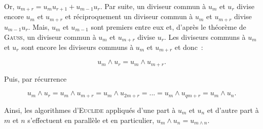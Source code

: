 {\begin{enumerate}
{Or, $u_{m+r}=u_mu_{r+1}+u_{m-1}u_r$. Par suite, un diviseur commun à $u_m$ et $u_r$ divise encore $u_m$ et $u_{m+r}$ et réciproquement un diviseur commun à $u_m$ et $u_{m+r}$ divise $u_{m-1}u_r$. Mais, $u_m$ et $u_{m-1}$ sont premiers entre eux et, d'après le théorème de \textsc{Gauss}, un diviseur commun à $u_m$ et $u_{m+r}$ divise $u_r$. Les diviseurs communs à $u_m$ et $u_r$ sont encore les diviseurs communs à $u_m$ et $u_{m+r}$ et donc~:

$$u_m\wedge u_r=u_m\wedge u_{m+r}.$$
 
Puis, par récurrence 

$$u_m\wedge u_r=u_m\wedge u_{m+r}=u_m\wedge u_{2m+r}=...=u_m\wedge u_{qm+r}=u_m\wedge u_n.$$

Ainsi, les algorithmes d'\textsc{Euclide} appliqués d'une part à $u_m$ et $u_n$ et d'autre part à $m$ et $n$ s'effectuent en parallèle et en particulier, $u_m\wedge u_n=u_{m\wedge n}.$}
\end{enumerate}
}
